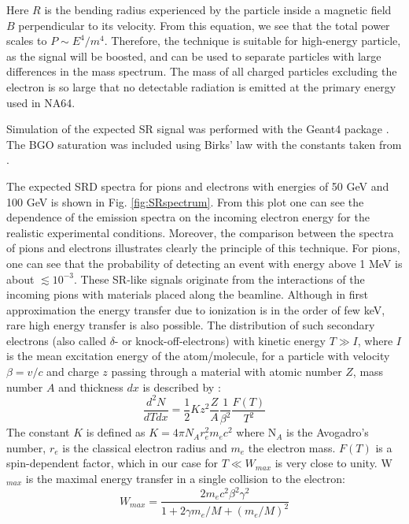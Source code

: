 Here $R$ is the bending radius experienced by the particle inside a magnetic field $B$ perpendicular to its velocity. From this equation, we see that the total power scales to $P\sim E^4/m^4$. Therefore, the technique is suitable for high-energy particle, as the signal will be boosted, and can be used to separate particles with large differences in the mass spectrum. The mass of all charged particles excluding the electron is so large that no detectable radiation is emitted at the primary energy used in NA64. 

Simulation of the expected SR signal was performed with the Geant4 package \cite{ALLISON2016186,1610988,AGOSTINELLI2003250}. The BGO saturation was included using Birks' law with the constants taken from \cite{AVDEICHIKOV2002251}.

The expected SRD spectra for pions and electrons with energies of 50 GeV and 100 GeV is shown in Fig. \ref{fig:SRspectrum}. From this plot one can see the dependence of the emission spectra on the incoming electron energy for the realistic experimental conditions. Moreover, the comparison between the spectra of pions and electrons illustrates clearly the principle of this technique. For pions, one can see that the probability of detecting an event with energy above 1 MeV is about $\lesssim 10^{-3}$.
These SR-like signals originate from the interactions of the incoming pions with materials placed along the beamline. Although in first approximation the energy transfer due to ionization is in the order of few \si{\kilo\electronvolt}, rare high energy transfer is also possible. The distribution of such secondary electrons (also called $\delta$- or knock-off-electrons) with
kinetic energy $T\gg I$, where $I$ is the mean excitation energy of the
atom/molecule, for a particle with velocity $\beta=v/c$ and charge $z$
passing through a material with atomic number $Z$, mass number $A$ and
thickness $dx$ is described by \cite{review-particle-physics}:
\begin{equation}
\frac{d^2N}{dTdx} = \frac{1}{2}K z^2 \frac{Z}{A}
\frac{1}{\beta^2}\frac{F(T)}{T^2}
\label{eqn:knock-on}
\end{equation}
The constant $K$ is defined as $K=4\pi N_A r_e^2 m_e c^2$ where N$_A$ is
the Avogadro's number, $r_e$ is the classical electron radius and $m_e$
the electron mass.
$F(T)$ is a spin-dependent factor, which in our case for $T \ll W_{max}$
is very close to unity. W$_{max}$ is the maximal energy transfer in a single collision to the
electron:
\begin{equation}
W_{max} = \frac{2m_e c^2 \beta^2 \gamma^2}{1+ 2\gamma m_e/M+(m_e/M)^2}
\end{equation}
